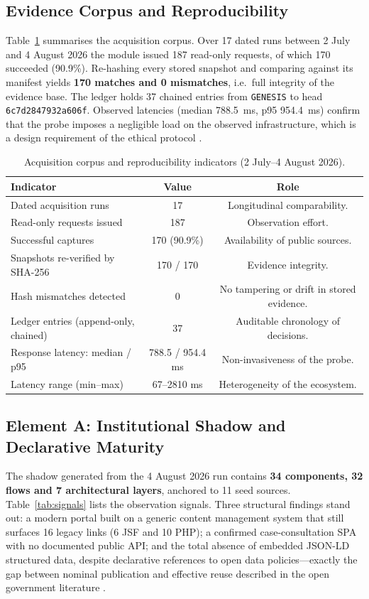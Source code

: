 \documentclass[engproc,article,submit,moreauthors]{Definitions/mdpi}
\begin{document}
\subsection{Evidence Corpus and Reproducibility}
Table~\ref{tab:corpus} summarises the acquisition corpus. Over 17 dated runs between 2 July and 4 August 2026 the module issued 187 read-only requests, of which 170 succeeded (90.9\%). Re-hashing every stored snapshot and comparing against its manifest yields \textbf{170 matches and 0 mismatches}, i.e.\ full integrity of the evidence base. The ledger holds 37 chained entries from \texttt{GENESIS} to head \texttt{6c7d2847932a606f}. Observed latencies (median 788.5~ms, p95 954.4~ms) confirm that the probe imposes a negligible load on the observed infrastructure, which is a design requirement of the ethical protocol \cite{Krotov2020}.

\begin{table}[H]
\small
\caption{Acquisition corpus and reproducibility indicators (2 July--4 August 2026).\label{tab:corpus}}
\begin{tabularx}{\textwidth}{Xcc}
\toprule
\textbf{Indicator} & \textbf{Value} & \textbf{Role}\\
\midrule
Dated acquisition runs & 17 & Longitudinal comparability.\\
Read-only requests issued & 187 & Observation effort.\\
Successful captures & 170 (90.9\%) & Availability of public sources.\\
Snapshots re-verified by SHA-256 & 170 / 170 & Evidence integrity.\\
Hash mismatches detected & 0 & No tampering or drift in stored evidence.\\
Ledger entries (append-only, chained) & 37 & Auditable chronology of decisions.\\
Response latency: median / p95 & 788.5 / 954.4 ms & Non-invasiveness of the probe.\\
Latency range (min--max) & 67--2810 ms & Heterogeneity of the ecosystem.\\
\bottomrule
\end{tabularx}
\end{table}

\subsection{Element A: Institutional Shadow and Declarative Maturity}
The shadow generated from the 4 August 2026 run contains \textbf{34 components, 32 flows and 7 architectural layers}, anchored to 11 seed sources. Table~\ref{tab:signals} lists the observation signals. Three structural findings stand out: a modern portal built on a generic content management system that still surfaces 16 legacy links (6 JSF and 10 PHP); a confirmed case-consultation SPA with no documented public API; and the total absence of embedded JSON-LD structured data, despite declarative references to open data policies---exactly the gap between nominal publication and effective reuse described in the open government literature \cite{Janssen2012,Attard2015}.
\end{document}

